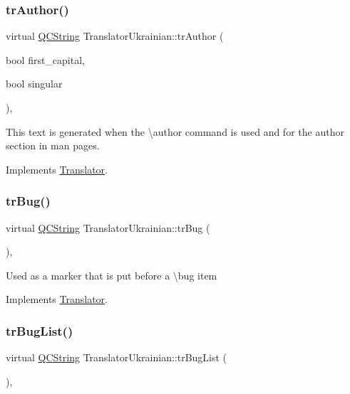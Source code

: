 \subsubsection{\texorpdfstring{trAuthor()}{trAuthor()}}
{\footnotesize\ttfamily virtual \mbox{\hyperlink{class_q_c_string}{Q\+C\+String}} Translator\+Ukrainian\+::tr\+Author (\begin{DoxyParamCaption}\item[{bool}]{first\+\_\+capital,  }\item[{bool}]{singular }\end{DoxyParamCaption})\hspace{0.3cm}{\ttfamily [inline]}, {\ttfamily [virtual]}}

This text is generated when the \textbackslash{}author command is used and for the author section in man pages. 

Implements \mbox{\hyperlink{class_translator}{Translator}}.

\mbox{\label{class_translator_ukrainian_a5cf0d6e1cc662df8e5a004c95989bfd1}} 
\subsubsection{\texorpdfstring{trBug()}{trBug()}}
{\footnotesize\ttfamily virtual \mbox{\hyperlink{class_q_c_string}{Q\+C\+String}} Translator\+Ukrainian\+::tr\+Bug (\begin{DoxyParamCaption}{ }\end{DoxyParamCaption})\hspace{0.3cm}{\ttfamily [inline]}, {\ttfamily [virtual]}}

Used as a marker that is put before a \textbackslash{}bug item 

Implements \mbox{\hyperlink{class_translator}{Translator}}.

\mbox{\label{class_translator_ukrainian_aba6f5a2b0eb1693eb0c4a9adda93a227}} 
\subsubsection{\texorpdfstring{trBugList()}{trBugList()}}
{\footnotesize\ttfamily virtual \mbox{\hyperlink{class_q_c_string}{Q\+C\+String}} Translator\+Ukrainian\+::tr\+Bug\+List (\begin{DoxyParamCaption}{ }\end{DoxyParamCaption})\hspace{0.3cm}{\ttfamily [inline]}, {\ttfamily [virtual]}}

